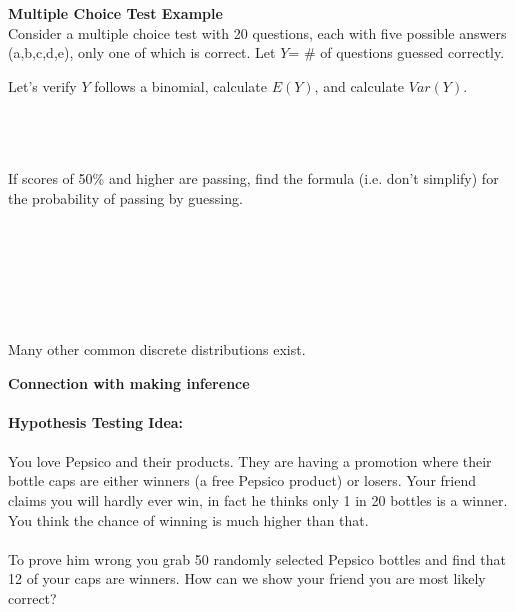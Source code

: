 \textbf{Multiple Choice Test Example}\\
Consider a multiple choice test with 20 questions, each with five possible answers (a,b,c,d,e), only one of which is correct. Let $Y$= \# of questions guessed correctly.
\be
\item Let's verify $Y$ follows a binomial, calculate $E(Y)$, and calculate $Var(Y)$.\\~\\~\\~\\
\item If scores of 50\% and higher are passing, find the formula (i.e. don't simplify) for the probability of passing by guessing.\\~\\~\\~\\~\\~\\~\\
\ee

Many other common discrete distributions exist.

\pagebreak

\textbf{Connection with making inference}\\~\\
\textbf{Hypothesis Testing Idea:} \\~\\
You love Pepsico and their products.  They are having a promotion where their bottle caps are either winners (a free Pepsico product) or losers.  Your friend claims you will hardly ever win, in fact he thinks only 1 in 20 bottles is a winner.  You think the chance of winning is much higher than that.  \\~\\
To prove him wrong you grab 50 randomly selected Pepsico bottles and find that 12 of your caps are winners.  How can we show your friend you are most likely correct?



